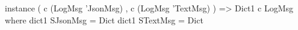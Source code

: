 \begin{code}
instance ( c (LogMsg 'JsonMsg)
         , c (LogMsg 'TextMsg)
         ) => Dict1 c LogMsg where
  dict1 SJsonMsg = Dict
  dict1 STextMsg = Dict
\end{code}
